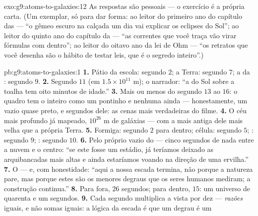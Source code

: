 \begin{solution}{exo:g9:atoms-to-galaxies:12}
As respostas são pessoais --- o exercício é a própria carta. (Um
exemplar, só para dar forma: ao leitor do primeiro ano do capítulo
das  --- ``o gêmeo escuro na calçada um dia vai explicar os
eclipses do Sol''; ao leitor do quinto ano do capítulo da  ---
``as correntes que você traça vão virar fórmulas com  dentro''; ao
leitor do oitavo ano da lei de Ohm --- ``os retratos que você desenha
são o hábito de testar leis, que é o segredo inteiro''.)
\end{solution}

\begin{solution}{pb:g9:atoms-to-galaxies:1}
\textbf{1.} Pátio da escola: segundo $2$; a Terra: segundo $7$; a
 da : segundo $9$.
\textbf{2.} Segundo $11$ (em $1.5 \times 10^{11}$ \unit{m}); o
narrador: ``a  do Sol sobre a toalha tem oito minutos de idade.''
\textbf{3.} Mais ou menos do segundo $13$ ao $16$: o quadro tem o
 inteiro como um pontinho e  nenhuma ainda ---
honestamente, um vazio quase preto, e segundos dele: as cenas mais
verdadeiras do filme.
\textbf{4.} O céu mais profundo já mapeado, $10^{26}$ \unit{m} de
galáxias --- com a  mais antiga dele mais velha que a própria
Terra.
\textbf{5.} Formiga: segundo $2$ para dentro; célula: segundo $5$;
: segundo $9$; : segundo $10$.
\textbf{6.} Pelo próprio vazio do  --- cinco segundos de nada
entre a nuvem e o centro: ``se este  fosse um estádio, já teríamos
deixado as arquibancadas mais altas e ainda estaríamos voando na
direção de uma ervilha.''
\textbf{7.} O  --- e, com honestidade: ``aqui a nossa escada
termina, não porque a natureza pare, mas porque estes são os menores
degraus que os seres humanos mediram; a construção continua.''
\textbf{8.} Para fora, $26$ segundos; para dentro, $15$: um universo
de quarenta e um segundos.
\textbf{9.} Cada segundo multiplica a vista por dez --- \emph{razões}
iguais, e não somas iguais: a lógica da escada é que um degrau é um

\end{solution}
